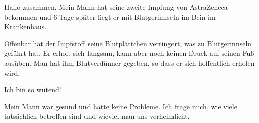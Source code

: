 

Hallo zusammen. Mein Mann hat seine zweite Impfung von AstraZeneca bekommen und 6 Tage später liegt er mit Blutgerinnseln im Bein im Krankenhaus.

Offenbar hat der Impfstoff seine Blutplättchen verringert, was zu Blutgerinnseln geführt hat. Er erholt sich langsam, kann aber noch keinen Druck auf seinen Fuß ausüben. Man hat ihm Blutverdünner gegeben, so dass er sich hoffentlich erholen wird.

Ich bin so wütend!

Mein Mann war gesund und hatte keine Probleme. Ich frage mich, wie viele tatsächlich betroffen sind und wieviel man uns verheimlicht.
